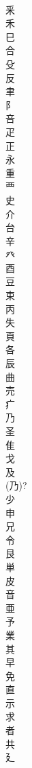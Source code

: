 \documentclass[8pt]{extreport}
\begin{document}
\begin{CJK}{UTF8}{min}
\\	釆	
\\	禾 
\\	巳	
\\	合	
\\	殳	
\\	反	
\\	聿	
\\	阝	
\\	咅	
\\	疋	
\\	正	
\\	永	
\\	重	
\\	覀	
\\	史	
\\	介	
\\	台	
\\	辛	
\\	癶	
\\	酉	
\\	豆	
\\	束	
\\	丙	
\\	失	
\\	頁	
\\	各	
\\	辰	
\\	曲	
\\	売	
\\	疒	
\\	乃	
\\	圣	
\\	隹	
\\	戈	
\\	及	
\\	(乃)? 
\\	少	
\\	申	
\\	兄	
\\	令	
\\	艮	
\\	単	
\\	皮	
\\	音	
\\	亜	
\\	予	
\\	業	
\\	其	
\\	早	
\\	免	
\\	直	
\\	示	
\\	求	
\\	者	
\\	共	
\\	廴	

\end{CJK}
\end{document}
